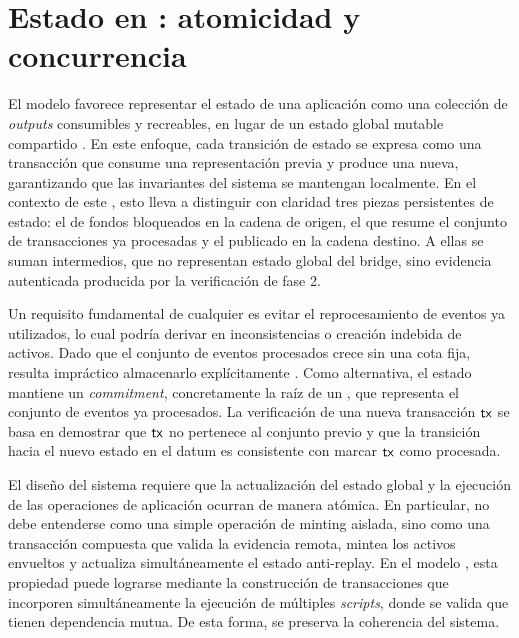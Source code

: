 \section{Estado en \eUTxO: atomicidad y concurrencia}
\label{sec:design-decisions-estado-en-eutxo-atomicidad-y-concurrencia}

El modelo \eUTxO favorece representar el estado de una aplicación como una colección de \textit{outputs} consumibles y recreables, en lugar de un estado global mutable compartido \cite{Chakravarty2020}. En este enfoque, cada transición de estado se expresa como una transacción que consume una representación previa y produce una nueva, garantizando que las invariantes del sistema se mantengan localmente. En el contexto de este \zkBridge, esto lleva a distinguir con claridad tres piezas persistentes de estado: el \UTxO de fondos bloqueados en la cadena de origen, el \TxsUpdaterUTxO que resume el conjunto de transacciones ya procesadas y el \StakeDistributionUTxO publicado en la cadena destino. A ellas se suman \ProofReceipt intermedios, que no representan estado global del bridge, sino evidencia autenticada producida por la verificación de fase 2.

Un requisito fundamental de cualquier \Bridge es evitar el reprocesamiento de eventos ya utilizados, lo cual podría derivar en inconsistencias o creación indebida de activos. Dado que el conjunto de eventos procesados crece sin una cota fija, resulta impráctico almacenarlo explícitamente \Onchain. Como alternativa, el estado mantiene un \emph{commitment}, concretamente la raíz de un \SMT, que representa el conjunto de eventos ya procesados. La verificación de una nueva transacción $\mathsf{tx}$ se basa en demostrar que $\mathsf{tx}$ no pertenece al conjunto previo y que la transición hacia el nuevo estado en el datum es consistente con marcar $\mathsf{tx}$ como procesada.

El diseño del sistema requiere que la actualización del estado global y la ejecución de las operaciones de aplicación ocurran de manera atómica. En particular, \MintTx no debe entenderse como una simple operación de minting aislada, sino como una transacción compuesta que valida la evidencia remota, mintea los activos envueltos y actualiza simultáneamente el estado anti-replay. En el modelo \eUTxO, esta propiedad puede lograrse mediante la construcción de transacciones que incorporen simultáneamente la ejecución de múltiples \textit{scripts}, donde se valida que tienen dependencia mutua. De esta forma, se preserva la coherencia del sistema.

